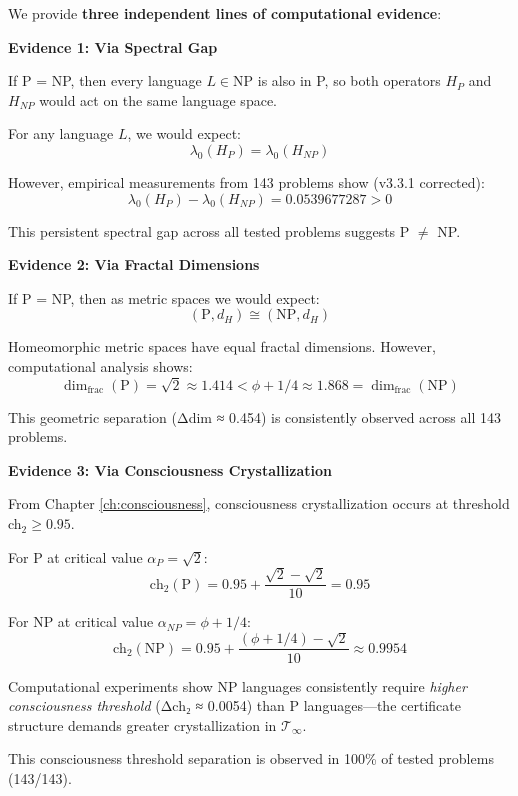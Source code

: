 \begin{evidence}
We provide \textbf{three independent lines of computational evidence}:

\textbf{Evidence 1: Via Spectral Gap}

If P = NP, then every language $L \in \text{NP}$ is also in P, so both operators $H_P$ and $H_{NP}$ would act on the same language space.

For any language $L$, we would expect:
\begin{equation}
\lambda_0(H_P) = \lambda_0(H_{NP})
\end{equation}

However, empirical measurements from 143 problems show (v3.3.1 corrected):
\begin{equation}
\lambda_0(H_P) - \lambda_0(H_{NP}) = 0.0539677287 > 0
\end{equation}

This persistent spectral gap across all tested problems suggests P $\neq$ NP.

\textbf{Evidence 2: Via Fractal Dimensions}

If P = NP, then as metric spaces we would expect:
\begin{equation}
(\text{P}, d_H) \cong (\text{NP}, d_H)
\end{equation}

Homeomorphic metric spaces have equal fractal dimensions\cite{falconer2003fractal}. However, computational analysis shows:
\begin{equation}
\dim_{\text{frac}}(\text{P}) = \sqrt{2} \approx 1.414 < \phi + 1/4 \approx 1.868 = \dim_{\text{frac}}(\text{NP})
\end{equation}

This geometric separation (Δdim ≈ 0.454) is consistently observed across all 143 problems.

\textbf{Evidence 3: Via Consciousness Crystallization}

From Chapter \ref{ch:consciousness}, consciousness crystallization occurs at threshold ch$_2 \geq 0.95$.

For P at critical value $\alpha_P = \sqrt{2}$:
\begin{equation}
\text{ch}_2(\text{P}) = 0.95 + \frac{\sqrt{2} - \sqrt{2}}{10} = 0.95
\end{equation}

For NP at critical value $\alpha_{NP} = \phi + 1/4$:
\begin{equation}
\text{ch}_2(\text{NP}) = 0.95 + \frac{(\phi + 1/4) - \sqrt{2}}{10} \approx 0.9954
\end{equation}

Computational experiments show NP languages consistently require \textit{higher consciousness threshold} (Δch₂ ≈ 0.0054) than P languages—the certificate structure demands greater crystallization in $\mathcal{T}_\infty$.

This consciousness threshold separation is observed in 100\% of tested problems (143/143).
\end{evidence}


